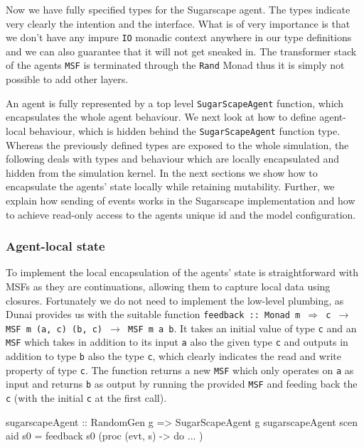 Now we have fully specified types for the Sugarscape agent. The types indicate very clearly the intention and the interface. What is of very importance is that we don't have any impure \texttt{IO} monadic context anywhere in our type definitions and we can also guarantee that it will not get sneaked in. The transformer stack of the agents \texttt{MSF} is terminated through the \texttt{Rand} Monad thus it is simply not possible to add other layers. 

An agent is fully represented by a top level \texttt{SugarScapeAgent} function, which encapsulates the whole agent behaviour. We next look at how to define agent-local behaviour, which is hidden behind the \texttt{SugarScapeAgent} function type. Whereas the previously defined types are exposed to the whole simulation, the following deals with types and behaviour which are locally encapsulated and hidden from the simulation kernel. In the next sections we show how to encapsulate the agents' state locally while retaining mutability. Further, we explain how sending of events works in the Sugarscape implementation and how to achieve read-only access to the agents unique id and the model configuration.

\subsubsection{Agent-local state}
To implement the local encapsulation of the agents' state is straightforward with MSFs as they are continuations, allowing them to capture local data using closures. Fortunately we do not need to implement the low-level plumbing, as Dunai provides us with the suitable function \texttt{feedback :: Monad m $\Rightarrow$ c $\rightarrow$ MSF m (a, c) (b, c) $\rightarrow$ MSF m a b}. It takes an initial value of type \texttt{c} and an \texttt{MSF} which takes in addition to its input \texttt{a} also the given type \texttt{c} and outputs in addition to type \texttt{b} also the type \texttt{c}, which clearly indicates the read and write property of type \texttt{c}. The function returns a new \texttt{MSF} which only operates on \texttt{a} as input and returns \texttt{b} as output by running the provided \texttt{MSF} and feeding back the \texttt{c} (with the initial \texttt{c} at the first call).

\begin{HaskellCode}
sugarscapeAgent :: RandomGen g => SugarScapeAgent g
sugarscapeAgent scen aid s0 = feedback s0 (proc (evt, s) -> do ... )
\end{HaskellCode}

